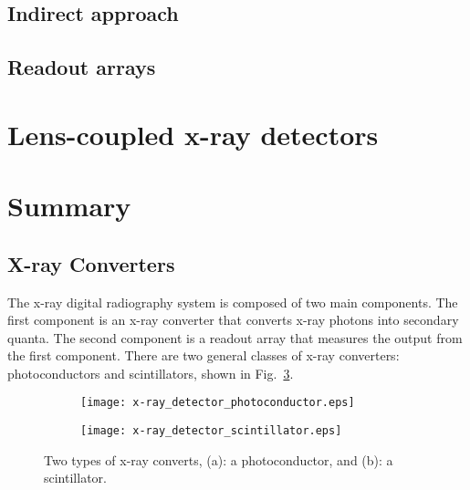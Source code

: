 \subsection{Indirect approach}


\subsection{Readout arrays}

\section{Lens-coupled x-ray detectors}

\section{Summary}



\subsection{X-ray Converters}
\label{subsect:x-ray_converters}
The x-ray digital radiography system is composed of two main components.  The first component is an x-ray converter that converts x-ray photons into secondary quanta.  The second component is a readout array that measures the output from the first component.  There are two general classes of x-ray converters: photoconductors and scintillators, shown in Fig.~\ref{fig:x-ray_detector}.

\begin{figure}[ht]
\centering
	\begin{subfigure}[h]{0.3\linewidth}
		\texttt{[image: x-ray\_detector\_photoconductor.eps]}
		\caption{}
		\label{fig:xray_photoconductor}
	\end{subfigure}
	\hspace{2 cm}
	\begin{subfigure}[h]{0.3\linewidth}
		\texttt{[image: x-ray\_detector\_scintillator.eps]}
		\caption{}
		\label{fig:xray_scintillator}
	\end{subfigure}
	\caption{Two types of x-ray converts, (a): a photoconductor, and (b): a scintillator.}
	\label{fig:x-ray_detector}
\end{figure}

